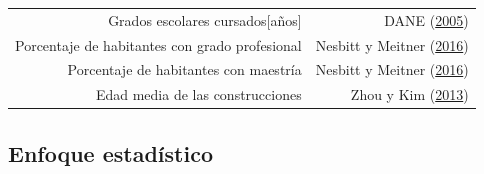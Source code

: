 \documentclass[12pt,a4paper,oneside, openany]{book}
\theoremstyle{definition}
\theoremstyle{definition}
\theoremstyle{definition}
\theoremstyle{remark}
\begin{document}
\begin{longtable}[]{@{}rr@{}}
\begin{minipage}[t]{0.57\columnwidth}\raggedleft\strut
Grados escolares cursados{[}años{]}\strut
\end{minipage} & \begin{minipage}[t]{0.31\columnwidth}\raggedleft\strut
DANE (\protect\hyperlink{ref-censo_sistema_dane}{2005})\strut
\end{minipage}\tabularnewline
\begin{minipage}[t]{0.57\columnwidth}\raggedleft\strut
Porcentaje de habitantes con grado profesional\strut
\end{minipage} & \begin{minipage}[t]{0.31\columnwidth}\raggedleft\strut
Nesbitt y Meitner
(\protect\hyperlink{ref-nesbitt_exploring_2016}{2016})\strut
\end{minipage}\tabularnewline
\begin{minipage}[t]{0.57\columnwidth}\raggedleft\strut
Porcentaje de habitantes con maestría\strut
\end{minipage} & \begin{minipage}[t]{0.31\columnwidth}\raggedleft\strut
Nesbitt y Meitner
(\protect\hyperlink{ref-nesbitt_exploring_2016}{2016})\strut
\end{minipage}\tabularnewline
\begin{minipage}[t]{0.57\columnwidth}\raggedleft\strut
Edad media de las construcciones\strut
\end{minipage} & \begin{minipage}[t]{0.31\columnwidth}\raggedleft\strut
Zhou y Kim (\protect\hyperlink{ref-zhou_social_2013}{2013})\strut
\end{minipage}\tabularnewline
\bottomrule
\end{longtable}

\subsection{Enfoque estadístico}\label{enfoque-estaduxedstico}
\end{document}
